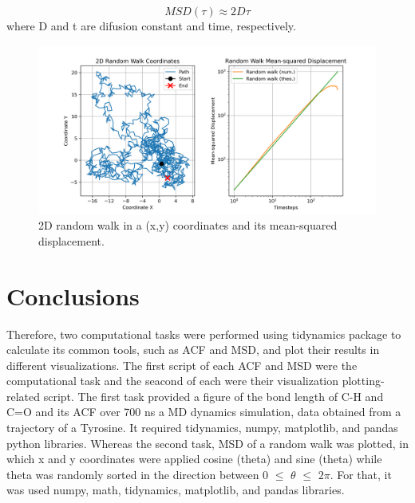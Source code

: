 \documentclass{article}
\begin{document}
\begin{equation}
MSD(\tau) \approx 2 D \tau
\label{eqn:msd2}
\end{equation}
where D and t are difusion constant and time, respectively.


\begin{figure}[H]
\includegraphics[width=\linewidth]{msd_plot.png}
\caption{2D random walk in a (x,y) coordinates and its mean-squared displacement.}
\label{fig:msd_plot}
\end{figure}

\section{Conclusions}

Therefore, two computational tasks were performed using tidynamics package to calculate its common tools, such as ACF and MSD, and plot their results in different visualizations. The first script of each ACF and MSD were the computational task and the seacond of each were their visualization plotting-related script. The first task provided a figure of the bond length of C-H and C=O and its ACF over 700 ns a MD dynamics simulation, data obtained from a trajectory of a Tyrosine. It required tidynamics, numpy, matplotlib, and pandas python libraries. Whereas the second task, MSD of a random walk was plotted, in which x and y coordinates were applied cosine (theta) and sine (theta) while theta was randomly sorted in the direction between 0 $\leq$ $\theta$ $\leq$ $2\pi$. For that, it was used numpy, math, tidynamics, matplotlib, and pandas libraries.



\end{document}

